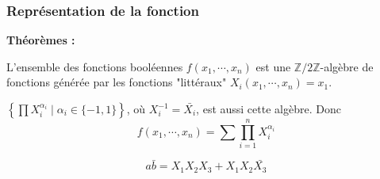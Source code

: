 \documentclass[handout]{beamer}
\newcommand{\ZZ}{{\mathbb{Z}/2\mathbb{Z}}}
\newcommand{\ensemble}[1]{{\left\lbrace{} #1 \right\rbrace{}}}
\begin{document}
\begin{frame}
  \frametitle{Représentation de la fonction}
  
  \textbf{Théorèmes :}
  \begin{mdframed}
  L'ensemble des fonctions booléennes $f(x_1, \cdots, x_n)$ est une $\ZZ$-algèbre de fonctions générée par les fonctions "littéraux" $X_i (x_1, \cdots, x_n) = x_1$.
  \end{mdframed} 
  
  \begin{mdframed}
  $\ensemble{\prod X_i^{\alpha_i} \mid \alpha_i\in \{-1,1\}}$, où $X_i^{-1} = \bar{X_i}$, est aussi cette algèbre. Donc 
  \[ f(x_1,\cdots, x_n) = \sum \prod_{i=1}^n X_i^{\alpha_i} \]
  \end{mdframed}
  
  
  \begin{figure}[p]
  \begin{tikzpicture}[scale=1.5]
  
  \end{tikzpicture}
  \end{figure}
  
  \[ a\bar{b} = X_1 X_2 X_3 + X_1 X_2 \bar{X_3} \]
  \vfill\null
  

\end{frame}
\end{document}
